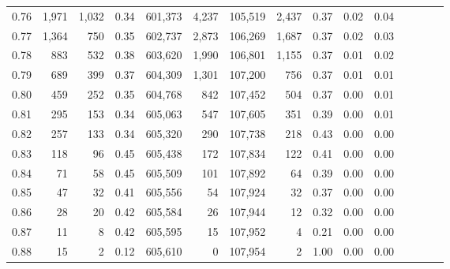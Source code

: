 \begin{tabular}{rrrcrrrrrrrrrrr}
0.76 &   1,971 &  1,032 &                                       0.34 &  601,373 &    4,237 &  105,519 &    2,437 &  0.37 &  0.02 &                         0.04 \\
0.77 &   1,364 &    750 &                                       0.35 &  602,737 &    2,873 &  106,269 &    1,687 &  0.37 &  0.02 &                         0.03 \\
0.78 &     883 &    532 &                                       0.38 &  603,620 &    1,990 &  106,801 &    1,155 &  0.37 &  0.01 &                         0.02 \\
0.79 &     689 &    399 &                                       0.37 &  604,309 &    1,301 &  107,200 &      756 &  0.37 &  0.01 &                         0.01 \\
0.80 &     459 &    252 &                                       0.35 &  604,768 &      842 &  107,452 &      504 &  0.37 &  0.00 &                         0.01 \\
0.81 &     295 &    153 &                                       0.34 &  605,063 &      547 &  107,605 &      351 &  0.39 &  0.00 &                         0.01 \\
0.82 &     257 &    133 &                                       0.34 &  605,320 &      290 &  107,738 &      218 &  0.43 &  0.00 &                         0.00 \\
0.83 &     118 &     96 &                                       0.45 &  605,438 &      172 &  107,834 &      122 &  0.41 &  0.00 &                         0.00 \\
0.84 &      71 &     58 &                                       0.45 &  605,509 &      101 &  107,892 &       64 &  0.39 &  0.00 &                         0.00 \\
0.85 &      47 &     32 &                                       0.41 &  605,556 &       54 &  107,924 &       32 &  0.37 &  0.00 &                         0.00 \\
0.86 &      28 &     20 &                                       0.42 &  605,584 &       26 &  107,944 &       12 &  0.32 &  0.00 &                         0.00 \\
0.87 &      11 &      8 &                                       0.42 &  605,595 &       15 &  107,952 &        4 &  0.21 &  0.00 &                         0.00 \\
0.88 &      15 &      2 &                                       0.12 &  605,610 &        0 &  107,954 &        2 &  1.00 &  0.00 &                         0.00 \\

\end{tabular}
